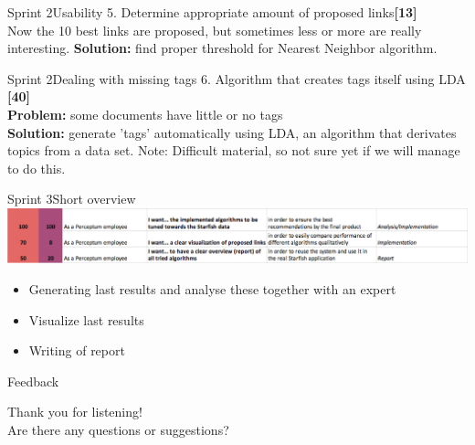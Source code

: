 \begin{frame}{Sprint 2}{Usability}
{\large 5. Determine appropriate amount of proposed links{\bf [13]}}\\
Now the 10 best links are proposed, but sometimes less or more are really interesting.\newline \newline
{\bf Solution:} find proper threshold for Nearest Neighbor algorithm. 
\end{frame}

\begin{frame}{Sprint 2}{Dealing with missing tags}
{\large 6. Algorithm that creates tags itself using LDA {\bf[40]}}\\
{\bf Problem:} some documents have little or no tags\\
{\bf Solution:} generate 'tags' automatically using LDA, an algorithm that derivates topics from a data set.\newline \newline
Note: Difficult material, so not sure yet if we will manage to do this. 
\end{frame}

\begin{frame}{Sprint 3}{Short overview}
\includegraphics[width=\linewidth]{sprint2.jpg}
\begin{itemize}
\item Generating last results and analyse these together with an expert
\item Visualize last results
\item Writing of report
\end{itemize}

\end{frame}

\begin{frame}{Feedback}

{\large Thank you for listening!}\\
Are there any questions or suggestions?
\end{frame}
